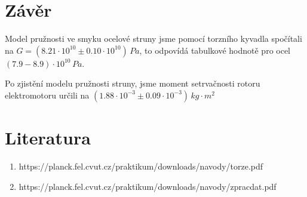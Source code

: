 \documentclass[11pt, a4paper]{report}
\begin{document}


\chapter{Závěr}
\large
Model pružnosti ve smyku ocelové struny jsme pomocí torzního kyvadla spočítali na $G = (8.21\cdot10^{10}\pm0.10\cdot10^{10})\,Pa$, to odpovídá tabulkové hodnotě pro ocel $(7.9-8.9)\cdot10^{10}\,Pa$.
\newline
\newline 

\noindent Po zjistění modelu pružnosti struny, jsme moment setrvačnosti rotoru elektromotoru určili na $(1.88\cdot10^{-3}\pm0.09\cdot10^{-3})\,kg\cdot m^2$ 

\chapter{Literatura}
\begin{enumerate}
  \item https://planck.fel.cvut.cz/praktikum/downloads/navody/torze.pdf
  \item https://planck.fel.cvut.cz/praktikum/downloads/navody/zpracdat.pdf
\end{enumerate}
\end{document}
